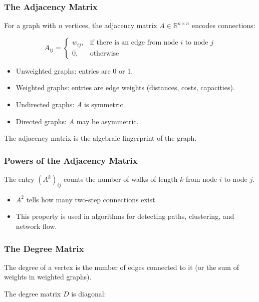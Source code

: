 \documentclass[
  letterpaper,
  DIV=11,
  numbers=noendperiod]{scrreprt}
\providecommand{\tightlist}{%
  \setlength{\itemsep}{0pt}\setlength{\parskip}{0pt}}
\begin{document}
\subsubsection{The Adjacency Matrix}\label{the-adjacency-matrix}

For a graph with \(n\) vertices, the adjacency matrix
\(A \in \mathbb{R}^{n \times n}\) encodes connections:

\[
A_{ij} = \begin{cases} 
w_{ij}, & \text{if there is an edge from node \(i\) to node \(j\)} \\ 
0, & \text{otherwise}
\end{cases}
\]

\begin{itemize}
\tightlist
\item
  Unweighted graphs: entries are 0 or 1.
\item
  Weighted graphs: entries are edge weights (distances, costs,
  capacities).
\item
  Undirected graphs: \(A\) is symmetric.
\item
  Directed graphs: \(A\) may be asymmetric.
\end{itemize}

The adjacency matrix is the algebraic fingerprint of the graph.

\subsubsection{Powers of the Adjacency
Matrix}\label{powers-of-the-adjacency-matrix}

The entry \((A^k)_{ij}\) counts the number of walks of length \(k\) from
node \(i\) to node \(j\).

\begin{itemize}
\tightlist
\item
  \(A^2\) tells how many two-step connections exist.
\item
  This property is used in algorithms for detecting paths, clustering,
  and network flow.
\end{itemize}

\subsubsection{The Degree Matrix}\label{the-degree-matrix}

The degree of a vertex is the number of edges connected to it (or the
sum of weights in weighted graphs).

The degree matrix \(D\) is diagonal:
\end{document}
